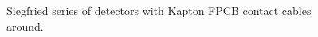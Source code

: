 \begin{figure}[tbhp]
  \centering
  \hfil %
  \caption{Siegfried series of detectors with Kapton FPCB contact     cables around.}
\label{fig:ger:sies}
\end{figure}

